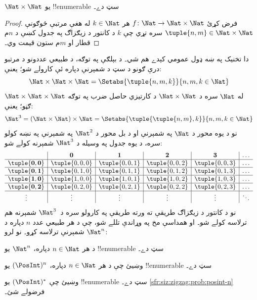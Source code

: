 \documentclass[../../../include/open-logic-section]{subfiles}
\begin{document}
\begin{prop}
$\Nat \times \Nat$ يو !!{enumerable} سټ دے۔
\end{prop}

\begin{proof}
فرض کړئ $f \colon \Nat \to \Nat\times\Nat$ هر $k \in \Nat$
له هغې مرتبې څوګونې $\tuple{n,m} \in \Nat \times \Nat$ سره
تړي چې $k$ د کانتور د زيګزاګ په جدول کښې د $n$م قطار او
$m$م ستون قيمت وي۔
\end{proof}

\begin{explain}
دا تخنيک په ښه ډول عمومي کېدے هم شي۔ د بېلګې په توګه، د
طبيعي عددونو د مرتبو درې ګونو د سټ د شمېرنې دپاره ئې
کارولے شو؛ يعنې:
\[
\Nat \times \Nat \times \Nat = \Setabs{\tuple{n,m,k}}{n,m,k \in \Nat}
\]
$\Nat \times \Nat \times \Nat$ له $\Nat$ سره د $\Nat \times \Nat$
د کارتيزي حاصل ضرب په توګه ګڼو؛ يعنې:
\[
\Nat^3 = (\Nat \times \Nat) \times \Nat =
\Setabs{\tuple{\tuple{n,m},k}}{n, m, k
  \in \Nat }
\]
نو د يوه محور د $\Nat$ په شمېرنې او د بل محور د $\Nat^2$
په شمېرنې په نښه کولو سره، د يوه جدول په وسيله د $\Nat^3$
شمېرنه کولے شو:
\[
\begin{array}{ c | c | c | c | c | c}
& \mathbf 0 & \mathbf 1 & \mathbf 2 & \mathbf 3 & \dots \\
\hline
\mathbf{\tuple{0,0}} & \tuple{0,0,0} & \tuple{0,0,1} & \tuple{0,0,2} & \tuple{0,0,3} & \dots \\
\hline
\mathbf{\tuple{0,1}} & \tuple{0,1,0} & \tuple{0,1,1} & \tuple{0,1,2} & \tuple{0,1,3} & \dots \\
\hline
\mathbf{\tuple{1,0}} & \tuple{1,0,0} & \tuple{1,0,1} & \tuple{1,0,2} & \tuple{1,0,3} & \dots \\
\hline
\mathbf{\tuple{0,2}} & \tuple{0,2,0} & \tuple{0,2,1} & \tuple{0,2,2} & \tuple{0,2,3} & \dots\\
\hline
\vdots & \vdots & \vdots & \vdots & \vdots & \ddots \\
\end{array}
\]
نو د کانتور د زيګزاګ طريقې ته ورته طريقې په کارولو سره د~$\Nat^3$
شمېرنه هم ترلاسه کولے شو۔ او همداسې مخ په وړاندې تللے شو،
چې د هر طبيعي عدد $n$ دپاره د $\Nat^n$ شمېرنې ترلاسه کړو۔ نو لرو:
\end{explain}

\begin{prop}
د هر $n \in \Nat$ دپاره، $\Nat^n$ يو !!{enumerable} سټ دے۔
\end{prop}

\begin{prob}\label{sfr:siz:zigzag:prob:posint-n}
وښيئ چې د هر $n \in \Nat$ دپاره، $(\PosInt)^n$ يو !!{enumerable} سټ دے۔
\end{prob}

\begin{prob}\label{sfr:siz:zigzag:prob:posint-star}
  وښيئ چې $(\PosInt)^*$ يو !!{enumerable} سټ دے۔
  \cref{sfr:siz:zigzag:prob:posint-n} فرضولے شئ۔
\end{prob}
\end{document}
